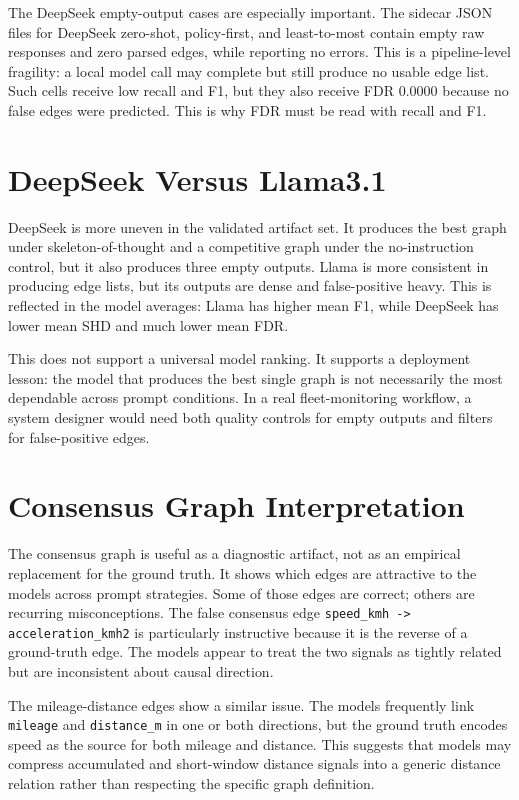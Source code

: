 The DeepSeek empty-output cases are especially important. The sidecar JSON
files for DeepSeek zero-shot, policy-first, and least-to-most contain empty
raw responses and zero parsed edges, while reporting no errors. This is a
pipeline-level fragility: a local model call may complete but still produce no
usable edge list. Such cells receive low recall and F1, but they also receive
FDR 0.0000 because no false edges were predicted. This is why FDR must be read
with recall and F1.

\section{DeepSeek Versus Llama3.1}

DeepSeek is more uneven in the validated artifact set. It produces the
best graph under skeleton-of-thought and a competitive graph under the
no-instruction control, but it also produces three empty outputs. Llama is
more consistent in producing edge lists, but its outputs are dense and
false-positive heavy. This is reflected in the model averages: Llama has
higher mean F1, while DeepSeek has lower mean SHD and much lower mean FDR.

This does not support a universal model ranking. It supports a deployment
lesson: the model that produces the best single graph is not necessarily the
most dependable across prompt conditions. In a real fleet-monitoring workflow,
a system designer would need both quality controls for empty outputs and
filters for false-positive edges.

\section{Consensus Graph Interpretation}

The consensus graph is useful as a diagnostic artifact, not as an empirical
replacement for the ground truth. It shows which edges are attractive to the
models across prompt strategies. Some of those edges are correct; others are
recurring misconceptions. The false consensus edge
\texttt{speed\_kmh -> acceleration\_kmh2} is particularly instructive because
it is the reverse of a ground-truth edge. The models appear to treat the two
signals as tightly related but are inconsistent about causal direction.

The mileage-distance edges show a similar issue. The models frequently link
\texttt{mileage} and \texttt{distance\_m} in one or both directions, but the
ground truth encodes speed as the source for both mileage and distance. This
suggests that models may compress accumulated and short-window distance
signals into a generic distance relation rather than respecting the specific
graph definition.

